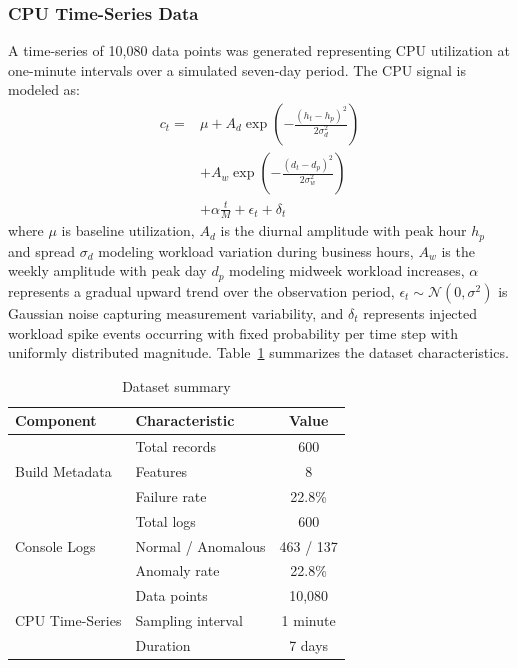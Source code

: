 \documentclass[a4paper,fleqn]{cas-dc}
\begin{document}
\subsubsection{CPU Time-Series Data}
A time-series of 10,080 data points was generated representing CPU utilization at one-minute intervals over a simulated seven-day period.
The CPU signal is modeled as:
\begin{equation}\label{eq:cpusignal}
\begin{split}
c_t = {} & \mu + A_d \exp\!\left(-\frac{(h_t - h_p)^2}{2\sigma_d^2}\right) \\
         & + A_w \exp\!\left(-\frac{(d_t - d_p)^2}{2\sigma_w^2}\right) \\
         & + \alpha \frac{t}{M} + \epsilon_t + \delta_t
\end{split}
\end{equation}
where $\mu$ is baseline utilization, $A_d$ is the diurnal amplitude with peak hour $h_p$ and spread $\sigma_d$ modeling workload variation during business hours, $A_w$ is the weekly amplitude with peak day $d_p$ modeling midweek workload increases, $\alpha$ represents a gradual upward trend over the observation period, $\epsilon_t \sim \mathcal{N}(0, \sigma^2)$ is Gaussian noise capturing measurement variability, and $\delta_t$ represents injected workload spike events occurring with fixed probability per time step with uniformly distributed magnitude.
Table~\ref{tab:dataset} summarizes the dataset characteristics.

\begin{table}[htbp]
\caption{Dataset summary}\label{tab:dataset}
\begin{tabular*}{\tblwidth}{@{\extracolsep{\fill}}llc@{}}
\toprule
\textbf{Component} & \textbf{Characteristic} & \textbf{Value} \\
\midrule
\multirow{3}{*}{Build Metadata} & Total records & 600 \\
 & Features & 8 \\
 & Failure rate & 22.8\% \\
\midrule
\multirow{3}{*}{Console Logs} & Total logs & 600 \\
 & Normal / Anomalous & 463 / 137 \\
 & Anomaly rate & 22.8\% \\
\midrule
\multirow{3}{*}{CPU Time-Series} & Data points & 10,080 \\
 & Sampling interval & 1 minute \\
 & Duration & 7 days \\
\bottomrule
\end{tabular*}
\end{table}
\end{document}
